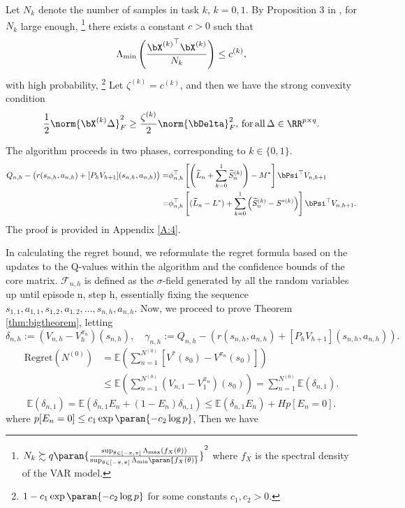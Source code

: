 Let $N_k$ denote the number of samples in task $k$, $k=0,1$. By Proposition 3 in \citep{basu2019low}, for $N_k$ large enough, \footnote{$N_k \succsim q \paran{\frac{\sup_{\theta \in [-\pi, \pi]}\Lambda_{\max}(f_X(\theta))}{\sup_{\theta \in [-\pi, \pi]}\Lambda_{\min}\paran{f_X(\theta)}}}^2$ where $f_X$ is the spectral density of the VAR model.} there exists a constant $c>0$ such that 
\begin{equation}
\Lambda_{\min}\left(\frac{{\bX^{(k)}}^{\top}\bX^{(k)}}{N_k}\right) \leq c^{(k)},
\label{eq:ass-number}
\end{equation}
    with high probability, \footnote{$1-c_1\exp\paran{-c_2\log p}$ for some constants $c_1, c_2>0$.} Let $\zeta^{(k)}=c^{(k)}$, and then we have the strong convexity condition
    \begin{equation}
    	\frac{1}{2}\norm{\bX^{(k)}\Delta}_F^2 \geq \frac{\zeta^{(k)}}{2}\norm{\bDelta}_F^2, \, \mathrm{for \, all \,} \Delta \in \RR^{p \times q}.
    	\label{eq:StrongConvexity}
    \end{equation}


    The algorithm proceeds in two phases, corresponding to $k \in \{0, 1\}$.
\begin{align*}
Q_{n,h} - \big(r(s_{n,h},a_{n,h}) + [P_h V_{h+1}](s_{n,h},a_{n,h})\big) 
=& \phi_{n, h}^{\top}\left[\left(\widetilde{L}_{n} + \sum_{k=0}^1\widetilde{S}_{n}^{(k)}\right) - M^*\right] \bPsi^{\top} V_{n, h+1} \\
= &\phi_{n, h}^{\top}\left[(\widetilde{L}_{n}-L^*) + \sum_{k=0}^1\left(\widetilde{S}_{n}^{(k)}-S^{*(k)}\right)\right] \bPsi^{\top} V_{n, h+1}.
\end{align*}
The proof is provided in Appendix \ref{A:4}.

In calculating the regret bound, we reformulate the regret formula based on the updates to the Q-values within the algorithm and the confidence bounds of the core matrix. $\mathcal{F}_{n,h}$ is defined as the $\sigma$-field generated by all the random variables up until episode n, step h, essentially fixing the sequence $s_{1,1}, a_{1,1}, s_{1,2}, a_{1,2}, \ldots, s_{n,h}, a_{n,h}$. 
Now, we proceed to prove Theorem \ref{thm:bigtheorem}, letting 
$$\delta_{n,h} := (V_{n,h}-V_{h}^{\pi_{n}})(s_{n,h}), \quad
\gamma_{n,h} := Q_{n,h} - \left(r(s_{n,h},a_{n,h}) + [P_h V_{h+1}](s_{n,h},a_{n,h})\right).$$
\begin{align*}
\text{Regret}(N^{(0)}) &= \mathbb{E}\left(\sum_{n=1}^{N^{(0)}} \left[ V^*(s_0) - V^{\pi_n}(s_0) \right]\right) \\
&\leq \mathbb{E}\left( \sum_{n=1}^{N^{(0)}}(V_{n,1}-V_{1}^{\pi_{n}})(s_0)\right) = \sum_{n=1}^{N^{(0)}}\mathbb{E}(\delta_{n,1}).
\end{align*}
$$\mathbb{E}(\delta_{n,1}) = \mathbb{E}(\delta_{n,1}E_n+(1-E_n)\delta_{n,1}) 
\leq \mathbb{E}(\delta_{n,1}E_n)+Hp[E_n=0].$$
where $p[E_n=0]\leq c_1\exp\paran{-c_2\log p}$, Then we have

